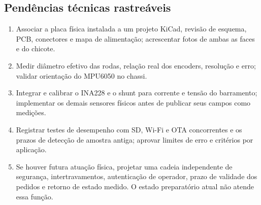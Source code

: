 \subsection{Pendências técnicas rastreáveis}
\begin{enumerate}
\item Associar a placa física instalada a um projeto KiCad, revisão de esquema, PCB, conectores e mapa de alimentação; acrescentar fotos de ambas as faces e do chicote.
\item Medir diâmetro efetivo das rodas, relação real dos encoders, resolução e erro; validar orientação do MPU6050 no chassi.
\item Integrar e calibrar o INA228 e o shunt para corrente e tensão do barramento; implementar os demais sensores físicos antes de publicar seus campos como medições.
\item Registrar testes de desempenho com SD, Wi-Fi e OTA concorrentes e os prazos de detecção de amostra antiga; aprovar limites de erro e critérios por aplicação.
\item Se houver futura atuação física, projetar uma cadeia independente de segurança, intertravamentos, autenticação de operador, prazo de validade dos pedidos e retorno de estado medido. O estado preparatório atual não atende essa função.
\end{enumerate}
